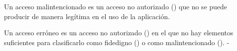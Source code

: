 
{
  Un acceso malintencionado es un acceso no autorizado
  () que no se puede producir de manera
  legítima en el uso de la aplicación.
}

{
  Un acceso erróneo es un acceso no autorizado
  () en el que no hay elementos
  suficientes para clasificarlo como fidedigno
  () o como malintencionado
  ().
}-
